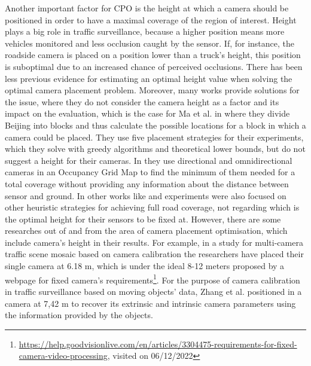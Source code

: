 Another important factor for CPO is the height at which a camera should be positioned in order to have a maximal coverage of the region of interest. Height plays a big role in traffic surveillance, because a higher position means more vehicles monitored and less occlusion caught by the sensor. If, for instance, the roadside camera is placed on a position lower than a truck's height, this position is suboptimal due to an increased chance of perceived occlusions. There has been less previous evidence for estimating an optimal height value when solving the optimal camera placement problem. Moreover, many works provide solutions for the issue, where they do not consider the camera height as a factor and its impact on the evaluation, which is the case for Ma et al. in \cite{surveillance_related_work} where they divide Beijing into blocks and thus calculate the possible locations for a block in which a camera could be placed. They use five placement strategies for their experiments, which they solve with greedy algorithms and theoretical lower bounds, but do not suggest a height for their cameras. In \cite{total_coverage_optimum} they use directional and omnidirectional cameras in an Occupancy Grid Map to find the minimum of them needed for a total coverage without providing any information about the distance between sensor and ground. In other works like \cite{max_camera_coverage} and \cite{genetic_alg} experiments were also focused on other heuristic strategies for achieving full road coverage, not regarding which is the optimal height for their sensors to be fixed at. However, there are some researches out of and from the area of camera placement optimisation, which include camera's height in their results. For example, in a study for multi-camera traffic scene mosaic based on camera calibration \cite{multi_camera_calib} the researchers have placed their single camera at 6.18 m, which is under the ideal 8-12 meters proposed by a webpage for fixed camera's requirements\footnote{\url{https://help.goodvisionlive.com/en/articles/3304475-requirements-for-fixed-camera-video-processing}, visited on 06/12/2022}. For the purpose of camera calibration in traffic surveillance based on moving objects' data, Zhang et al. positioned in \cite{practical_camera_calib} a camera at 7,42 m to recover its extrinsic and intrinsic camera parameters using the information provided by the objects.  

